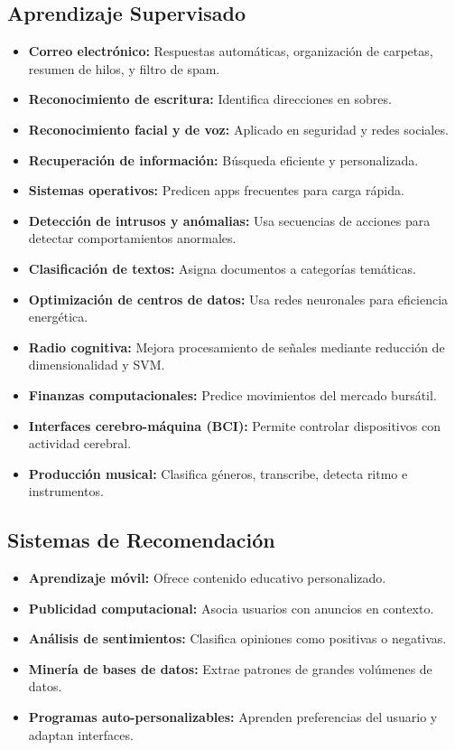 \documentclass[12pt]{article}
\begin{document}
\subsection{Aprendizaje Supervisado}
\begin{itemize}
  \item \textbf{Correo electr\'onico:} Respuestas autom\'aticas, organizaci\'on de carpetas, resumen de hilos, y filtro de spam.
  \item \textbf{Reconocimiento de escritura:} Identifica direcciones en sobres.
  \item \textbf{Reconocimiento facial y de voz:} Aplicado en seguridad y redes sociales.
  \item \textbf{Recuperaci\'on de informaci\'on:} B\'usqueda eficiente y personalizada.
  \item \textbf{Sistemas operativos:} Predicen apps frecuentes para carga r\'apida.
  \item \textbf{Detecci\'on de intrusos y an\'omalias:} Usa secuencias de acciones para detectar comportamientos anormales.
  \item \textbf{Clasificaci\'on de textos:} Asigna documentos a categor\'ias tem\'aticas.
  \item \textbf{Optimizaci\'on de centros de datos:} Usa redes neuronales para eficiencia energ\'etica.
  \item \textbf{Radio cognitiva:} Mejora procesamiento de se\~nales mediante reducci\'on de dimensionalidad y SVM.
  \item \textbf{Finanzas computacionales:} Predice movimientos del mercado burs\'atil.
  \item \textbf{Interfaces cerebro-m\'aquina (BCI):} Permite controlar dispositivos con actividad cerebral.
  \item \textbf{Producci\'on musical:} Clasifica g\'eneros, transcribe, detecta ritmo e instrumentos.
\end{itemize}

\subsection{Sistemas de Recomendaci\'on}
\begin{itemize}
  \item \textbf{Aprendizaje m\'ovil:} Ofrece contenido educativo personalizado.
  \item \textbf{Publicidad computacional:} Asocia usuarios con anuncios en contexto.
  \item \textbf{An\'alisis de sentimientos:} Clasifica opiniones como positivas o negativas.
  \item \textbf{Miner\'ia de bases de datos:} Extrae patrones de grandes vol\'umenes de datos.
  \item \textbf{Programas auto-personalizables:} Aprenden preferencias del usuario y adaptan interfaces.
\end{itemize}
\end{document}
